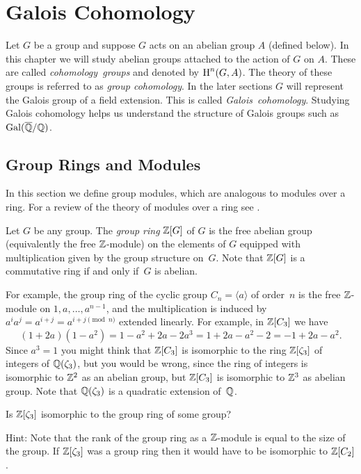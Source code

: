 \chapter{Galois Cohomology}\label{ch:gc}

Let $G$ be a group and suppose $G$ acts on an abelian group $A$
(defined below). In this chapter we will study abelian groups attached
to the action of $G$ on $A$. These are called \emph{cohomology~groups}
and denoted by $\operatorname{H}^n(G,A)$. The theory of these groups is referred
to as \emph{group cohomology}. In the later sections $G$ will represent
the Galois group of a field extension. This is called
\emph{Galois~cohomology}. Studying Galois cohomology helps us
understand the structure of Galois groups such as $\operatorname{Gal}(\overline{\mathbb{Q}}/\mathbb{Q})$.

\section{Group Rings and Modules}

In this section we define group modules, which are analogous
to modules over a ring. For a review of the theory of modules
over a ring see \cite[Ch.~10]{dummit2004abstract}.

\begin{definition}\label{def:groupring}
	Let $G$ be any group. The \emph{group ring} $\mathbb{Z}[G]$ of $G$
	is the free abelian group (equivalently the free $\mathbb{Z}$-module) on the elements of $G$ equipped
	with multiplication given by the group structure on~$G$.
	Note that $\mathbb{Z}[G]$ is a commutative ring if and only if~$G$ is
	abelian.
\end{definition}

\begin{example}
	For example, the group ring of the cyclic group
	$C_n=\langle a\rangle$ of order~$n$ is
	the free $\mathbb{Z}$-module on $1,a,\ldots, a^{n-1}$, and the multiplication
	is induced by $a^i a^j = a^{i+j} = a^{i + j \pmod{n}}$ extended
	linearly. For example, in  $\mathbb{Z}[C_3]$ we have
	$$
	(1 + 2 a)(1 - a^2) = 1 - a^2 + 2a - 2 a^3
	= 1 + 2a - a^2 - 2 = -1 + 2a - a^2.
	$$
	Since $a^3 = 1$
	you might think that $\mathbb{Z}[C_3]$ is isomorphic to the ring $\mathbb{Z}[\zeta_3]$
	of integers of $\mathbb{Q}(\zeta_3)$, but you would be wrong, since the ring
	of integers is isomorphic to $\mathbb{Z}^2$ as an abelian group, but $\mathbb{Z}[C_3]$
	is isomorphic to $\mathbb{Z}^3$ as abelian group. Note that $\mathbb{Q}(\zeta_3)$
	is a quadratic extension of~$\mathbb{Q}$.
\end{example}

\begin{exercise}
	Is $\mathbb{Z}[\zeta_3]$ isomorphic to the group ring of some group?

	Hint: Note that the rank of the group ring as a
	$\mathbb{Z}$-module is equal to the size of the group.
	If $\mathbb{Z}[\zeta_3]$ was a group ring then it would
	have to be isomorphic to $\mathbb{Z}[C_2]$.
\end{exercise}

